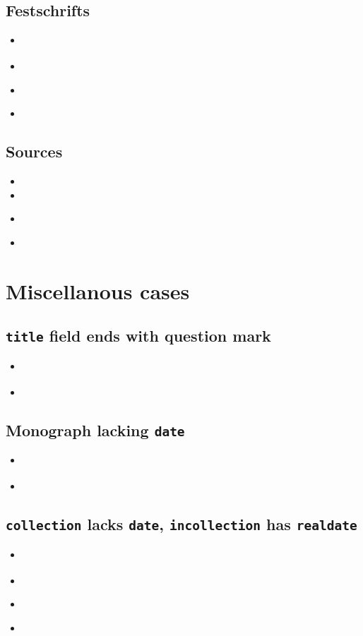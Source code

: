 \documentclass[a4paper,12pt]{scrartcl}
\newcommand{\Typ}[1]{\texttt{\symbol{64}#1}}
\newcommand{\Feld}[1]{\texttt{#1}}
\begin{document}
\subsection{Festschrifts}
\begin{itemize}
	\item\cite{kronsbein:siepen:2015}%
	\item{}%
    \item\cites{auler:hiller:2015a}%
    \item{}%
\end{itemize}

\subsection{Sources}
\begin{itemize}
	\item{}
	\item{}
    \item\cites{test::source}%
    \item{}%
\end{itemize}

\section{Miscellanous cases}

\subsection{\Feld{title} field ends with question mark}
\begin{itemize}
    \item\cite{edenmo:1997}%
	\item{}
\end{itemize}

\subsection{Monograph lacking \Feld{date}}
\begin{itemize}
	\item\cite{siebert:u:et:al:o:j}%
	\item{}%
\end{itemize}

\subsection{\Typ{collection} lacks \Feld{date}, \Typ{incollection} has \Feld{realdate}}
\begin{itemize}
	\item\cite{huet:o:j}%
	\item{}%
	\item\cite{mette:1990}%
	\item{}%
\end{itemize}
\end{document}
